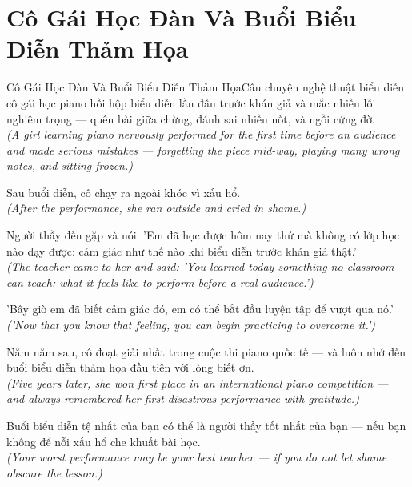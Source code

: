\section{Cô Gái Học Đàn Và Buổi Biểu Diễn Thảm Họa}
\begin{truyen}{Cô Gái Học Đàn Và Buổi Biểu Diễn Thảm Họa}{Câu chuyện nghệ thuật biểu diễn}
 cô gái học piano hồi hộp biểu diễn lần đầu trước khán giả và mắc nhiều lỗi nghiêm trọng --- quên bài giữa chừng, đánh sai nhiều nốt, và ngồi cứng đờ.\\[4pt]
\textit{(A girl learning piano nervously performed for the first time before an audience and made serious mistakes --- forgetting the piece mid-way, playing many wrong notes, and sitting frozen.)}

Sau buổi diễn, cô chạy ra ngoài khóc vì xấu hổ.\\[4pt]
\textit{(After the performance, she ran outside and cried in shame.)}

Người thầy đến gặp và nói: 'Em đã học được hôm nay thứ mà không có lớp học nào dạy được: cảm giác như thế nào khi biểu diễn trước khán giả thật.'\\[4pt]
\textit{(The teacher came to her and said: 'You learned today something no classroom can teach: what it feels like to perform before a real audience.')}

'Bây giờ em đã biết cảm giác đó, em có thể bắt đầu luyện tập để vượt qua nó.'\\[4pt]
\textit{('Now that you know that feeling, you can begin practicing to overcome it.')}

Năm năm sau, cô đoạt giải nhất trong cuộc thi piano quốc tế --- và luôn nhớ đến buổi biểu diễn thảm họa đầu tiên với lòng biết ơn.\\[4pt]
\textit{(Five years later, she won first place in an international piano competition --- and always remembered her first disastrous performance with gratitude.)}

\end{truyen}
\begin{baihoc}
  Buổi biểu diễn tệ nhất của bạn có thể là người thầy tốt nhất của bạn --- nếu bạn không để nỗi xấu hổ che khuất bài học.\\[4pt]
  \textit{(Your worst performance may be your best teacher --- if you do not let shame obscure the lesson.)}
\end{baihoc}

